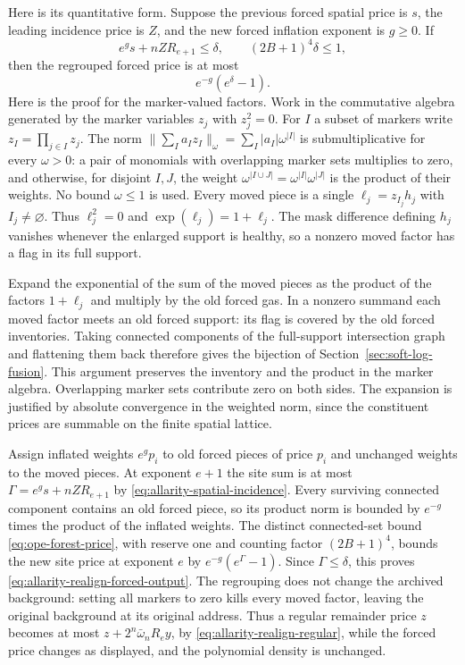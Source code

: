 Here is its quantitative form. Suppose the previous forced spatial
price is $s$, the leading incidence price is $Z$, and the new forced
inflation exponent is $g\ge0$. If
\begin{equation}\label{eq:allarity-realign-forced-input}
 e^g s+n Z R_{e+1}\le\delta,
           \qquad (2B+1)^4\delta\le1,
\end{equation}
then the regrouped forced price is at most
\begin{equation}\label{eq:allarity-realign-forced-output}
                           e^{-g}(e^\delta-1).
\end{equation}
Here is the proof for the marker-valued factors. Work in the
commutative algebra generated by the marker variables $z_j$ with
$z_j^2=0$. For $I$ a subset of markers write $z_I=\prod_{j\in I}z_j$.
The norm $\|\sum_I a_I z_I\|_\omega=\sum_I |a_I|\omega^{|I|}$ is
submultiplicative for every $\omega>0$: a pair of monomials with
overlapping marker sets multiplies to zero, and otherwise, for
disjoint $I,J$, the weight $\omega^{|I\cup J|}=\omega^{|I|}\omega^{|J|}$
is the product of their weights. No bound $\omega\le1$ is used. Every moved piece is a single $\ell_j=z_{I_j}h_j$ with
$I_j\ne\varnothing$. Thus $\ell_j^2=0$ and $\exp(\ell_j)=1+\ell_j$.
The mask difference defining $h_j$ vanishes whenever the enlarged
support is healthy, so a nonzero moved factor has a flag in its full
support.

Expand the exponential of the sum of the moved pieces as the product
of the factors $1+\ell_j$ and multiply by the old forced gas. In a
nonzero summand each moved factor meets an old forced support: its flag
is covered by the old forced inventories. Taking connected components
of the full-support intersection graph and flattening them back
therefore gives the bijection of
Section~\ref{sec:soft-log-fusion}. This argument preserves the
inventory and the product in the marker algebra. Overlapping marker
sets contribute zero on both sides. The expansion is justified by
absolute convergence in the weighted norm, since the constituent
prices are summable on the finite spatial lattice.

Assign inflated weights $e^g p_i$ to old forced pieces of price $p_i$
and unchanged weights to the moved pieces. At exponent $e+1$ the
site sum is at most $\Gamma=e^g s+nZR_{e+1}$ by
\eqref{eq:allarity-spatial-incidence}. Every surviving connected
component contains an old forced piece, so its product norm is
bounded by $e^{-g}$ times the product of the inflated weights.
The distinct connected-set bound \eqref{eq:ope-forest-price},
with reserve one and counting factor $(2B+1)^4$, bounds the new
site price at exponent $e$ by $e^{-g}(e^\Gamma-1)$.
Since $\Gamma\le\delta$, this proves
\eqref{eq:allarity-realign-forced-output}. The regrouping does not
change the archived background: setting all markers to zero kills
every moved factor, leaving the original background at its original
address.
Thus a regular remainder price $z$ becomes at most
$z+2^n\bar\omega_nR_e y$, by \eqref{eq:allarity-realign-regular},
while the forced price changes as displayed, and the polynomial
density is unchanged.

